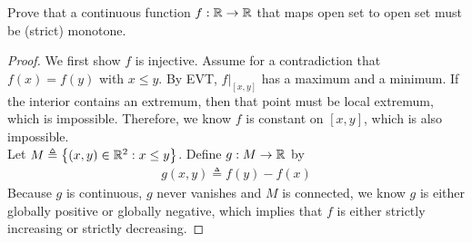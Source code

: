 \documentclass{report}
\begin{document}
\begin{question}{}{}
Prove that a continuous function $f:\mathbb{R} \rightarrow \mathbb{R}$ that maps open set to open set must be (strict) monotone.
\end{question}
\begin{proof}
We first show $f$ is injective. Assume for a contradiction that  $f(x)=f(y)$ with $x\leq y$. By EVT, $f|_{[x,y]}$ has a maximum and a minimum. If the interior contains an extremum, then that point must be local extremum, which is impossible. Therefore, we know $f$ is constant on $[x,y]$, which is also impossible. \\

Let $M\triangleq \left\{ (x,y)\in\mathbb{R}^2: x \leq y \right\}$. Define $g:M\rightarrow \mathbb{R}$ by 
\begin{align*}
g(x,y)\triangleq f(y)-f(x)
\end{align*}
Because $g$ is continuous, $g$ never vanishes and $M$ is connected, we know $g$ is either globally positive or globally negative, which implies that $f$ is either strictly increasing or strictly decreasing. 
\end{proof}
\end{document}
